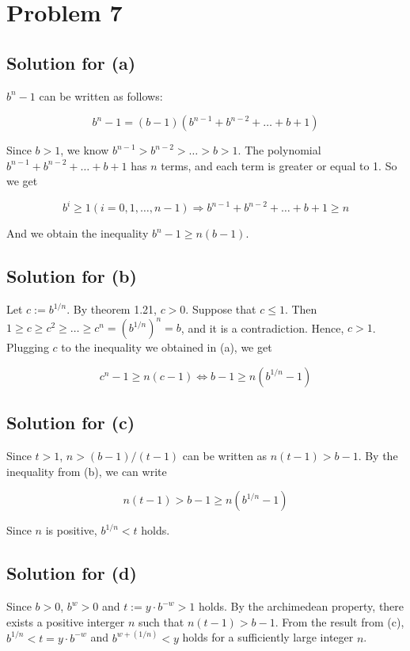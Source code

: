 \documentclass{scrartcl}
\begin{document}
\section{Problem 7}
\subsection{Solution for (a)}
\(b^n - 1\) can be written as follows:

\[
  b^n - 1 = (b - 1)(b^{n - 1} + b^{n - 2} + \dots + b + 1)
\]

Since \(b > 1\), we know \(b^{n - 1} > b^{n - 2} > \dots > b > 1\).
The polynomial \(b^{n - 1} + b^{n - 2} + \dots + b + 1\) has \(n\) terms, and each term is greater or equal to 1.
So we get

\[
  b^i \geq 1 (i = 0, 1, \dots, n - 1) \Longrightarrow b^{n - 1} + b^{n - 2} + \dots + b + 1 \geq n
\]

And we obtain the inequality \(b^n - 1 \geq n(b - 1)\).

\subsection{Solution for (b)}
Let \(c := b^{1 / n}\). By theorem 1.21, \(c > 0\). Suppose that \(c \leq 1\).
Then \(1 \geq c \geq c^2 \geq \dots \geq c^n = (b^{1 / n})^n = b\), and it is a contradiction.
Hence, \(c > 1\). Plugging \(c\) to the inequality we obtained in (a), we get

\[
  c^n - 1 \geq n(c - 1) \Longleftrightarrow b - 1 \geq n(b^{1 / n} - 1)
\]

\subsection{Solution for (c)}
Since \(t > 1\), \(n > (b - 1) / (t - 1)\) can be written as \(n(t - 1) > b - 1\).
By the inequality from (b), we can write

\[
  n(t - 1) > b - 1 \geq n(b^{1 / n} - 1)
\]

Since \(n\) is positive, \(b^{1 / n} < t\) holds.

\subsection{Solution for (d)}
Since \(b > 0\), \(b^w > 0\) and \(t := y \cdot b^{-w} > 1\) holds.
By the archimedean property, there exists a positive interger \(n\) such that \(n(t - 1) > b - 1\).
From the result from (c), \(b^{1 / n} < t = y \cdot b^{-w}\) and \(b^{w + (1 / n)} < y\) holds for a sufficiently large integer \(n\).
\end{document}
